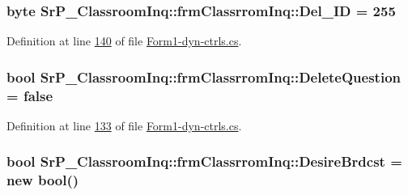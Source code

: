 \hypertarget{class_sr_p___classroom_inq_1_1frm_classrrom_inq_a9874b3534409b79a483f08f2aa03668d}{
\subsubsection[{\-Del\-\_\-\-I\-D}]{\setlength{\rightskip}{0pt plus 5cm}byte {\bf \-Sr\-P\-\_\-\-Classroom\-Inq\-::frm\-Classrrom\-Inq\-::\-Del\-\_\-\-I\-D} = 255}}
\label{class_sr_p___classroom_inq_1_1frm_classrrom_inq_a9874b3534409b79a483f08f2aa03668d}


\-Definition at line \hyperlink{_form1-dyn-ctrls_8cs_source_l00140}{140} of file \hyperlink{_form1-dyn-ctrls_8cs_source}{\-Form1-\/dyn-\/ctrls.\-cs}.

\hypertarget{class_sr_p___classroom_inq_1_1frm_classrrom_inq_ab3a8803fac827da5757e7451c1836010}{
\subsubsection[{\-Delete\-Question}]{\setlength{\rightskip}{0pt plus 5cm}bool {\bf \-Sr\-P\-\_\-\-Classroom\-Inq\-::frm\-Classrrom\-Inq\-::\-Delete\-Question} = false}}
\label{class_sr_p___classroom_inq_1_1frm_classrrom_inq_ab3a8803fac827da5757e7451c1836010}


\-Definition at line \hyperlink{_form1-dyn-ctrls_8cs_source_l00133}{133} of file \hyperlink{_form1-dyn-ctrls_8cs_source}{\-Form1-\/dyn-\/ctrls.\-cs}.

\hypertarget{class_sr_p___classroom_inq_1_1frm_classrrom_inq_ab67298a2e18c70080e8cc5e604223679}{
\subsubsection[{\-Desire\-Brdcst}]{\setlength{\rightskip}{0pt plus 5cm}bool {\bf \-Sr\-P\-\_\-\-Classroom\-Inq\-::frm\-Classrrom\-Inq\-::\-Desire\-Brdcst} = new bool()}}
\label{class_sr_p___classroom_inq_1_1frm_classrrom_inq_ab67298a2e18c70080e8cc5e604223679}



